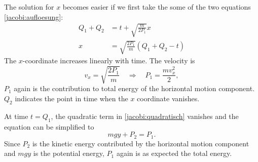 The solution for $x$ becomes easier if we first take the some
of the two equations
\eqref{jacobi:aufloesung}:
\begin{align*}
Q_1+Q_2&=t+\sqrt{\frac{m}{2P_1}}x\\
x&=\sqrt{\frac{2P_1}{m}}(Q_1+Q_2-t)
\end{align*}
The $x$-coordinate increases linearly with time.
The velocity is
\[
v_x=\sqrt{\frac{2P_1}{m}}\quad\Rightarrow\quad P_1=\frac{mv_x^2}2,
\]
$P_1$ again is the contribution to total energy of the horizontal
motion component.
$Q_2$ indicates the point in time when the $x$ coordinate vanishes.

At time $t=Q_1$, the quadratic term in \eqref{jacobi:quadratisch} vanishes
and the equation can be simplified to
\[
mgy + P_2=P_1.
\]
Since $P_2$ is the kinetic energy contributed by the horizontal motion
component and  $mgy$ is the potential energy, $P_1$ again is as
expected the total energy.

